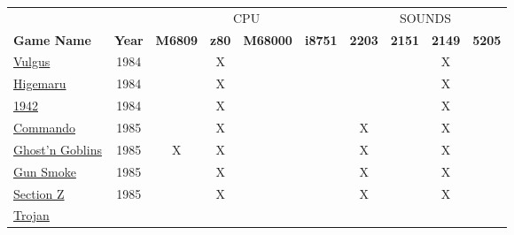 \begin{figure}[H]
{ 
\setlength{\tabcolsep}{3.0pt}
\setlength\cmidrulewidth{\heavyrulewidth} %
\begin{tabularx}{\textwidth}{Xccccccccc}

  & & \multicolumn{4}{c}{CPU} &  \multicolumn{4}{c}{SOUNDS} \\
  \cmidrule(lr){3-6}
  \cmidrule(lr){7-10}
 
  \textbf{Game Name} & \textbf{Year} & \textbf{M6809} & \textbf{z80} & \textbf{M68000} & \textbf{i8751} & \textbf{2203} & \textbf{2151} & \textbf{2149} & \textbf{5205} \\               
  \toprule    
\href{https://www.youtube.com/watch?v=45ELzG1ivEA}{Vulgus}
                & 1984          &               &      X       &              &              &               &               &       X       &               \\
\href{https://www.youtube.com/watch?v=R5mg6XPqtBs}{Higemaru}
                & 1984          &               &      X       &              &              &               &               &       X       &               \\
\href{https://www.youtube.com/watch?v=Em7UwOOBvlA}{1942}
                & 1984          &               &      X       &              &              &               &               &       X       &               \\
  \toprule    
\href{https://www.youtube.com/watch?v=1qctKI_t5eY}{Commando}
                & 1985          &               &      X       &              &              &       X       &               &       X       &               \\
\href{https://www.youtube.com/watch?v=SugLAqaPhqA}{Ghost'n Goblins}  
                & 1985          &       X       &      X       &              &              &       X       &               &       X       &               \\
\href{https://www.youtube.com/watch?v=mrO9qwGXdy8}{Gun Smoke}        
                & 1985          &               &      X       &              &              &       X       &               &       X       &               \\
\href{https://www.youtube.com/watch?v=cIC2mNNryZg}{Section Z}
                & 1985          &               &      X       &              &              &       X       &               &       X       &               \\
  \toprule    
\href{https://www.youtube.com/watch?v=L1FVWdlQNG8}{Trojan}

\end{tabularx}}
\end{figure}
